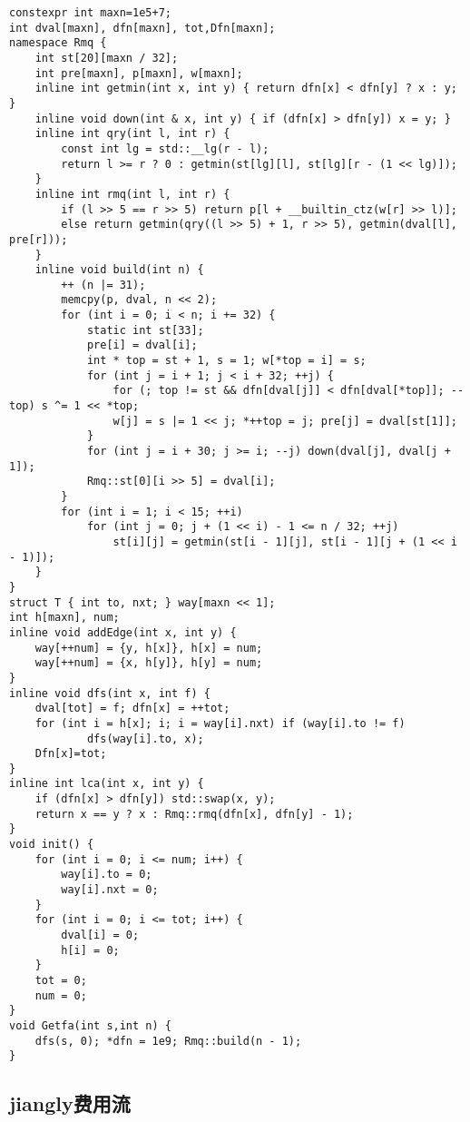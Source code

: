 \documentclass[a4paper,10pt]{article}
\begin{document}
\noindent\begin{lstlisting}
constexpr int maxn=1e5+7;
int dval[maxn], dfn[maxn], tot,Dfn[maxn];
namespace Rmq {
    int st[20][maxn / 32];
    int pre[maxn], p[maxn], w[maxn];
    inline int getmin(int x, int y) { return dfn[x] < dfn[y] ? x : y; }
    inline void down(int & x, int y) { if (dfn[x] > dfn[y]) x = y; }
    inline int qry(int l, int r) {
        const int lg = std::__lg(r - l);
        return l >= r ? 0 : getmin(st[lg][l], st[lg][r - (1 << lg)]);
    }
    inline int rmq(int l, int r) {
        if (l >> 5 == r >> 5) return p[l + __builtin_ctz(w[r] >> l)];
        else return getmin(qry((l >> 5) + 1, r >> 5), getmin(dval[l], pre[r]));
    }
    inline void build(int n) {
        ++ (n |= 31);
        memcpy(p, dval, n << 2);
        for (int i = 0; i < n; i += 32) {
            static int st[33];
            pre[i] = dval[i];
            int * top = st + 1, s = 1; w[*top = i] = s;
            for (int j = i + 1; j < i + 32; ++j) {
                for (; top != st && dfn[dval[j]] < dfn[dval[*top]]; --top) s ^= 1 << *top;
                w[j] = s |= 1 << j; *++top = j; pre[j] = dval[st[1]];
            }
            for (int j = i + 30; j >= i; --j) down(dval[j], dval[j + 1]);
            Rmq::st[0][i >> 5] = dval[i];
        }
        for (int i = 1; i < 15; ++i)
            for (int j = 0; j + (1 << i) - 1 <= n / 32; ++j)
                st[i][j] = getmin(st[i - 1][j], st[i - 1][j + (1 << i - 1)]);
    }
}
struct T { int to, nxt; } way[maxn << 1];
int h[maxn], num;
inline void addEdge(int x, int y) {
    way[++num] = {y, h[x]}, h[x] = num;
    way[++num] = {x, h[y]}, h[y] = num;
}
inline void dfs(int x, int f) {
    dval[tot] = f; dfn[x] = ++tot;
    for (int i = h[x]; i; i = way[i].nxt) if (way[i].to != f)
            dfs(way[i].to, x);
    Dfn[x]=tot;
}
inline int lca(int x, int y) {
    if (dfn[x] > dfn[y]) std::swap(x, y);
    return x == y ? x : Rmq::rmq(dfn[x], dfn[y] - 1);
}
void init() {
    for (int i = 0; i <= num; i++) {
        way[i].to = 0;
        way[i].nxt = 0;
    }
    for (int i = 0; i <= tot; i++) {
        dval[i] = 0;
        h[i] = 0;
    }
    tot = 0;
    num = 0;
}
void Getfa(int s,int n) {
    dfs(s, 0); *dfn = 1e9; Rmq::build(n - 1);
}\end{lstlisting}

\subsection{jiangly费用流}
\thispagestyle{fancy}
\end{document}

